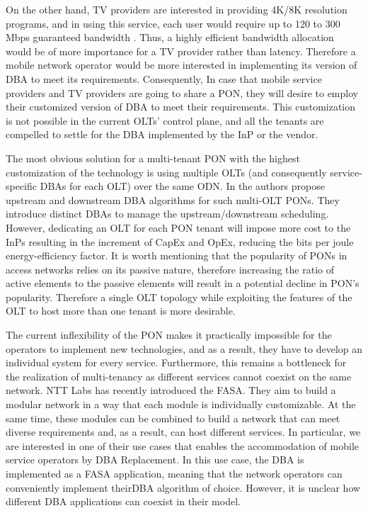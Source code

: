 On the other hand, TV providers are interested in providing 4K/8K resolution programs, and in using this service, each user would require up to 120 to 300 Mbps guaranteed bandwidth \cite{7121687}. Thus, a highly efficient bandwidth allocation would be of more importance for a TV provider rather than latency. Therefore a mobile network operator would be more interested in implementing its version of \ac{DBA} to meet its requirements. Consequently, In case that mobile service providers and TV providers are going to share a \ac{PON}, they will desire to employ their customized version of \ac{DBA} to meet their requirements. This customization is not possible in the current \acp{OLT}' control plane, and all the tenants are compelled to settle for the \ac{DBA} implemented by the \ac{InP} or the vendor.

The most obvious solution for a multi-tenant \ac{PON} with the highest customization of the technology is using multiple \acp{OLT} (and consequently service-specific \acp{DBA} for each \ac{OLT}) over the same \ac{ODN}. In \cite{6261710} the authors propose upstream and downstream \ac{DBA} algorithms for such multi-\ac{OLT} \acp{PON}. They introduce distinct \acp{DBA} to manage the upstream/downstream scheduling. However, dedicating an \ac{OLT} for each \ac{PON} tenant will impose more cost to the \acp{InP} resulting in the increment of \ac{CapEx} and \ac{OpEx}, reducing the bits per joule energy-efficiency factor. It is worth mentioning that the popularity of \acp{PON} in access networks relies on its passive nature, therefore increasing the ratio of active elements to the passive elements will result in a potential decline in \ac{PON}'s popularity. Therefore a single \ac{OLT} topology while exploiting the features of the \ac{OLT} to host more than one tenant is more desirable.


The current inflexibility of the \ac{PON} makes it practically impossible for the operators to implement new technologies, and as a result, they have to develop an individual system for every service. Furthermore, this remains a bottleneck for the realization of multi-tenancy as different services cannot coexist on the same network. \ac{NTT} Labs has recently introduced the \ac{FASA}. They aim to build a modular network in a way that each module is individually customizable. At the same time, these modules can be combined to build a network that can meet diverse requirements and, as a result, can host different services. In particular, we are interested in one of their use cases that enables the accommodation of mobile service operators by \ac{DBA} Replacement. In this use case, the \ac{DBA} is implemented as a \ac{FASA} application, meaning that the network operators can conveniently implement their\ac{DBA} algorithm of choice. However, it is unclear how different \ac{DBA} applications can coexist in their model.


